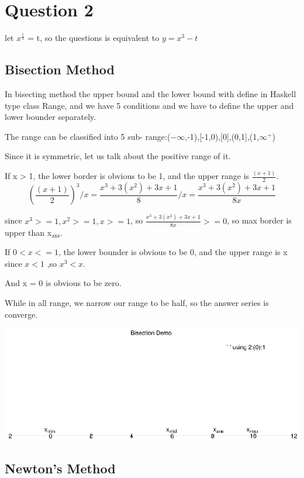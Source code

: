 \documentclass[setspace, doublespace]{scrartcl}
\begin{document}
\section{Question 2}
\label{sec:orgeaa0ad0}
let \(x^{\frac{1}{3}}\) = t, so the questions is equivalent to \(y = x^3 -t\)
\subsection{Bisection Method}
\label{sec:org550bdc6}
In bisecting method the upper bound and the lower bound with define in
Haskell type class Range, and we have 5 conditions and we have to define the
upper and lower bounder separately.

The range can be classified into 5 sub-
range:(\(-\infty\),-1),[-1,0),[0],(0,1],(1,\(\infty^+\))

Since it is symmetric, let us talk about the positive range of it.

If x > 1, the lower border is obvious to be 1, and the upper range is \(\frac{(x + 1)}{2}\).
$$(\frac{(x + 1)}{2})^3 / x = \frac{x^3 + 3(x^2)+3x+1}{8} / x =  \frac{x^3 + 3(x^2)+3x+1}{8x}$$

since \(x^3 >= 1, x^2 >=1 ,x>=1\), so \(\frac{x^3 + 3(x^2)+3x+1}{8x} >=0\), so
max border is upper than x\(_{\text{ans}}\).

If \(0<x<=1\), the lower bounder is obvious to be 0, and the upper range is x
since \(x<1\) ,so \(x^3 < x\).

And x = 0 is obvious to be zero.

While in all range, we narrow our range to be half, so the answer series is converge.

\begin{center}
\includegraphics[width=.9\linewidth]{test.eps}
\end{center}

\subsection{Newton's Method}
\label{sec:org42f2a0f}
\end{document}
